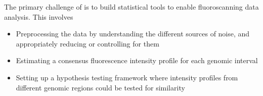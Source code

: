 \begin{tcolorbox}[colback=green!5,colframe=green!40!black,title=Statistical challenges] %
The primary challenge of is to build statistical tools to enable fluoroscanning data analysis. This involves
\begin{itemize}
\item Preprocessing the data by understanding the different sources of noise, and appropriately reducing or controlling for them
\item Estimating a consensus fluorescence intensity profile for each genomic interval
\item Setting up a hypothesis testing framework where intensity profiles from different genomic regions could be tested for similarity
\end{itemize}
\end{tcolorbox}



